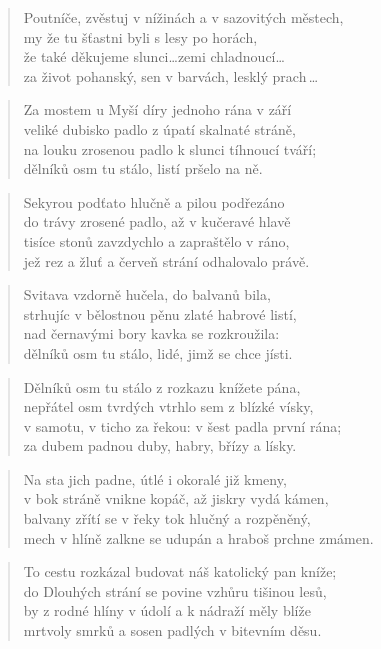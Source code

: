 \documentclass{book}
\begin{document}
\begin{verse}
Poutníče, zvěstuj v nížinách a v sazovitých městech,\\
my že tu šťastni byli s lesy po horách,\\
že také děkujeme slunci\ldots zemi chladnoucí\ldots\\
za život pohanský, sen v barvách, lesklý prach\,\ldots
\end{verse}
\newpage
{}
\begin{verse}
Za mostem u Myší díry jednoho rána v září\\
veliké dubisko padlo z úpatí skalnaté stráně,\\
na louku zrosenou padlo k slunci tíhnoucí tváří;\\
dělníků osm tu stálo, listí pršelo na ně.
\end{verse}
\begin{verse}
Sekyrou podťato hlučně a pilou podřezáno\\
do trávy zrosené padlo, až v kučeravé hlavě\\
tisíce stonů zavzdychlo a zapraštělo v ráno,\\
jež rez a žluť a červeň strání odhalovalo právě.
\end{verse}
\begin{verse}
Svitava vzdorně hučela, do balvanů bila,\\
strhujíc v bělostnou pěnu zlaté habrové listí,\\
nad černavými bory kavka se rozkroužila:\\
dělníků osm tu stálo, lidé, jimž se chce jísti.
\end{verse}
\begin{verse}
Dělníků osm tu stálo z rozkazu knížete pána,\\
nepřátel osm tvrdých vtrhlo sem z blízké vísky,\\
v samotu, v ticho za řekou: v šest padla první rána;\\
za dubem padnou duby, habry, břízy a lísky.
\end{verse}
\begin{verse}
Na sta jich padne, útlé i okoralé již kmeny,\\
v bok stráně vnikne kopáč, až jiskry vydá kámen,\\
balvany zřítí se v řeky tok hlučný a rozpěněný,\\
mech v hlíně zalkne se udupán a hraboš prchne zmámen.
\end{verse}
\begin{verse}
To cestu rozkázal budovat náš katolický pan kníže;\\
do Dlouhých strání se povine vzhůru tišinou lesů,\\
by z rodné hlíny v údolí a k nádraží měly blíže\\
mrtvoly smrků a sosen padlých v bitevním děsu.
\end{verse}
\end{document}
